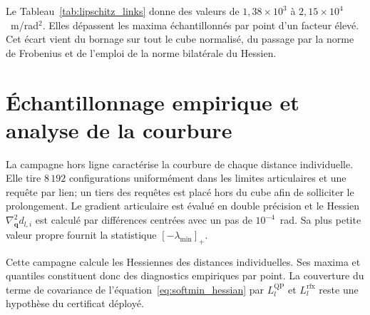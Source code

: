 Le Tableau~\ref{tab:lipschitz_links} donne des valeurs de $1{,}38\times10^{3}$ à $2{,}15\times10^{4}$~m/rad$^2$. Elles dépassent les maxima échantillonnés par point d'un facteur élevé. Cet écart vient du bornage sur tout le cube normalisé, du passage par la norme de Frobenius et de l'emploi de la norme bilatérale du Hessien.

\section*{Échantillonnage empirique et analyse de la courbure}

La campagne hors ligne caractérise la courbure de chaque distance individuelle. Elle tire $8\,192$ configurations uniformément dans les limites articulaires et une requête par lien; un tiers des requêtes est placé hors du cube afin de solliciter le prolongement. Le gradient articulaire est évalué en double précision et le Hessien $\nabla^2_{\mathbf q}d_{l,i}$ est calculé par différences centrées avec un pas de $10^{-4}$~rad. Sa plus petite valeur propre fournit la statistique $[-\lambda_{\min}]_+$.

Cette campagne calcule les Hessiennes des distances individuelles. Ses maxima et quantiles constituent donc des diagnostics empiriques par point. La couverture du terme de covariance de l'équation~\eqref{eq:softmin_hessian} par $L_l^{\mathrm{QP}}$ et $L_l^{\mathrm{rfx}}$ reste une hypothèse du certificat déployé.

